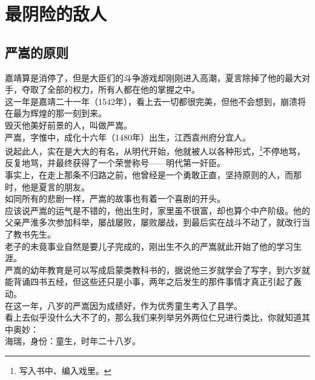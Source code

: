 \section{最阴险的敌人}
\ifnum{}
	\begin{multicols}{\theparacolNo}
\fi
\subsection{严嵩的原则}
嘉靖算是消停了，但是大臣们的斗争游戏却刚刚进入高潮，夏言除掉了他的最大对手，夺取了全部的权力，所有人都在他的掌握之中。\\

这一年是嘉靖二十一年（1542年），看上去一切都很完美，但他不会想到，崩溃将在最为辉煌的那一刻到来。\\

毁灭他美好前景的人，叫做严嵩。\\

严嵩，字惟中，成化十六年（1480年）出生，江西袁州府分宜人。\\

说起此人，实在是大大的有名，从明代开始，他就被人以各种形式，\footnote{写入书中、编入戏里。}不停地骂，反复地骂，并最终获得了一个荣誉称号——明代第一奸臣。\\

事实上，在走上那条不归路之前，他曾经是一个勇敢正直，坚持原则的人，而那时，他是夏言的朋友。\\

如同所有的悲剧一样，严嵩的故事也有着一个喜剧的开头。\\

应该说严嵩的运气是不错的，他出生时，家里虽不很富，却也算个中产阶级。他的父亲严淮多次参加科举，屡战屡败，屡败屡战，到最后实在战斗不动了，就改行当了教书先生。\\

老子的未竟事业自然是要儿子完成的，刚出生不久的严嵩就此开始了他的学习生涯。\\

严嵩的幼年教育是可以写成启蒙类教科书的，据说他三岁就学会了写字，到六岁就能背诵四书五经，但这些还只是小事，两年之后发生的那件事情才真正引起了轰动。\\

在这一年，八岁的严嵩因为成绩好，作为优秀童生考入了县学。\\

看上去似乎没什么大不了的，那么我们来列举另外两位仁兄进行类比，你就知道其中奥妙：\\

海瑞，身份：童生，时年二十八岁。\\


\end{multicols}
